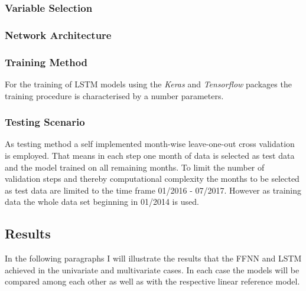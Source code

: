 \subsubsection{Variable Selection}


\subsubsection{Network Architecture}


\subsubsection{Training Method}
For the training of LSTM models using the \textit{Keras} and \textit{Tensorflow} packages the training procedure is characterised by a number parameters.



\subsubsection{Testing Scenario}
As testing method a self implemented month-wise leave-one-out cross validation is employed. That means in each step one month of data is selected as test data and the model trained on all remaining months. To limit the number of validation steps and thereby computational complexity the months to be selected as test data are limited to the time frame 01/2016 - 07/2017. However as training data the whole data set beginning in 01/2014 is used.
\subsection{Results}
In the following paragraphs I will illustrate the results that the FFNN and LSTM achieved in the univariate and multivariate cases. In each case the models will be compared among each other as well as with the respective linear reference model.
